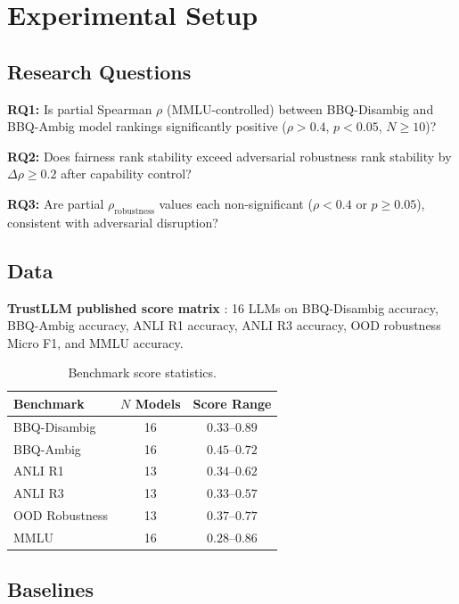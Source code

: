 \section{Experimental Setup}
\label{sec:experiments}

\subsection{Research Questions}

\textbf{RQ1:} Is partial Spearman $\rho$ (MMLU-controlled) between BBQ-Disambig and BBQ-Ambig model rankings significantly positive ($\rho > 0.4$, $p < 0.05$, $N \geq 10$)?

\textbf{RQ2:} Does fairness rank stability exceed adversarial robustness rank stability by $\Delta\rho \geq 0.2$ after capability control?

\textbf{RQ3:} Are partial $\rho_{\text{robustness}}$ values each non-significant ($\rho < 0.4$ or $p \geq 0.05$), consistent with adversarial disruption?

\subsection{Data}

\textbf{TrustLLM published score matrix} \citep{Sun2024TrustLLM}: 16 LLMs on BBQ-Disambig accuracy, BBQ-Ambig accuracy, ANLI R1 accuracy, ANLI R3 accuracy, OOD robustness Micro F1, and MMLU accuracy.

\begin{table}[h]
\centering
\caption{Benchmark score statistics.}
\label{tab:data}
\begin{tabular}{lcc}
\toprule
Benchmark & $N$ Models & Score Range \\
\midrule
BBQ-Disambig & 16 & $0.33$--$0.89$ \\
BBQ-Ambig & 16 & $0.45$--$0.72$ \\
ANLI R1 & 13 & $0.34$--$0.62$ \\
ANLI R3 & 13 & $0.33$--$0.57$ \\
OOD Robustness & 13 & $0.37$--$0.77$ \\
MMLU & 16 & $0.28$--$0.86$ \\
\bottomrule
\end{tabular}
\end{table}

\subsection{Baselines}

